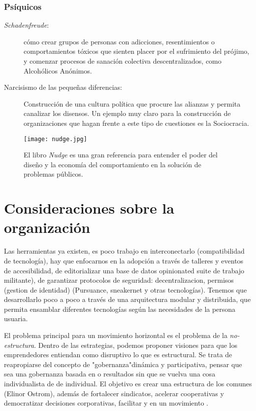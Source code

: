 \subsubsection{Psíquicos}
\label{subs:psiquicos}

\begin{description}
	\item[\emph{Schadenfreude}:] cómo crear grupos de personas con adicciones, resentimientos o comportamientos tóxicos que sienten placer por el sufrimiento del prójimo, y comenzar procesos de sanación colectiva descentralizados, como Alcohólicos Anónimos.

	\item[Narcisismo de las pequeñas diferencias:] Construcción de una cultura política que procure las alianzas y permita canalizar los disensos. Un ejemplo muy claro para la construcción de organizaciones que hagan frente a este tipo de cuestiones es la Sociocracia.
\end{description}

\begin{figure}[htbp]
	\centering	\texttt{[image: nudge.jpg]}
	\caption[\emph{Nudge}]{El libro \emph{Nudge} es una gran referencia para entender el poder del diseño y la economía del comportamiento en la solución de problemas públicos.}
	\label{fig:nudge}
\end{figure}

\section{Consideraciones sobre la organización}
\label{sec:considerorga}

Las herramientas ya existen, es poco trabajo en interconectarlo (compatibilidad de tecnología), hay que enfocarnos en la adopción a través de talleres y eventos de accesibilidad, de editorializar una base de datos opinionated suite de trabajo militante), de garantizar protocolos de seguridad: decentralizacion, permisos (gestion de identidad) (Pursuance, sneakernet y otras tecnologías). Tenemos que desarrollarlo poco a poco a través de una arquitectura modular y distribuida, que permita ensamblar diferentes tecnologías según las necesidades de la persona usuaria.

El problema principal para un movimiento horizontal es el problema de la \emph{no-estructura}.\revquotes{} Dentro de las estrategias, podemos proponer visiones para que los emprendedores entiendan como disruptivo lo que es estructural. Se trata de reapropiarse del concepto de "gobernanza"dinámica y participativa, pensar que sea una gobernanza basada en  o resultados sin que se vuelva una cosa individualista de  de  individual. El objetivo es crear una estructura de los comunes (Elinor Ostrom), además de fortalecer sindicatos, acelerar cooperativas y democratizar decisiones corporativas, facilitar  y  en un movimiento .

